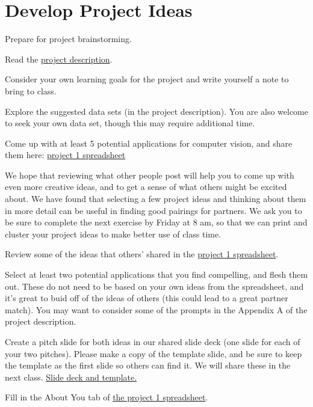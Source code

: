 \documentclass[assignment08_Solutions]{subfiles}
\begin{document}
\section{Develop Project Ideas}

\begin{exercise}
Prepare for project brainstorming.
\bes
\item Read the \href{https://github.com/olincollege/MLfall2021/blob/master/Module\%201/m1_project/m1_project.pdf}{project description}.
\item Consider your own learning goals for the project and write yourself a note to bring to class. 
\item Explore the suggested data sets (in the project description). You are also welcome to seek your own data set, though this may require additional time.
\item Come up with at least 5 potential applications for computer vision, and share them here: \href{https://docs.google.com/spreadsheets/d/1TyzKsfdCvZEzfaYswfJSHiYH2JU73gd0KCIOwQijvFo/edit?usp=sharing}{project 1 spreadsheet} 
\ees 
\end{exercise}
 
\vspace{1em}
We hope that reviewing what other people post will help you to come up with even more creative ideas, and to get a sense of what others might be excited about. We have found that selecting a few project ideas and thinking about them in more detail can be useful in finding good pairings for partners. We ask you to be sure to complete the next exercise by Friday at 8 am, so that we can print and cluster your project ideas to make better use of class time.
\vspace{1em}
\begin{exercise}
\bes
\item Review some of the ideas that others' shared in the \href{https://docs.google.com/spreadsheets/d/1TyzKsfdCvZEzfaYswfJSHiYH2JU73gd0KCIOwQijvFo/edit?usp=sharing}{project 1 spreadsheet}. 
\item Select at least two potential applications that you find compelling, and flesh them out. These do not need to be based on your own ideas from the spreadsheet, and it's great to buid off of the ideas of others (this could lead to a great partner match). You may want to consider some of the prompts in the Appendix A of the project description.
\item Create a pitch slide for both ideas in our shared slide deck (one slide for each of your two pitches). Please make a copy of the template slide, and be sure to keep the template as the first slide so others can find it. We will share these in the next class. \href{https://docs.google.com/presentation/d/1f3u9lJXV9_DzKRhHH41kr8h3xQn4ex6SbpcNwyws9z4/edit?usp=sharing}{Slide deck and template.} 
\item Fill in the About You tab of \href{https://docs.google.com/spreadsheets/d/1TyzKsfdCvZEzfaYswfJSHiYH2JU73gd0KCIOwQijvFo/edit?usp=sharing}{the project 1 spreadsheet}.
\ees
\end{exercise}
\end{document}
